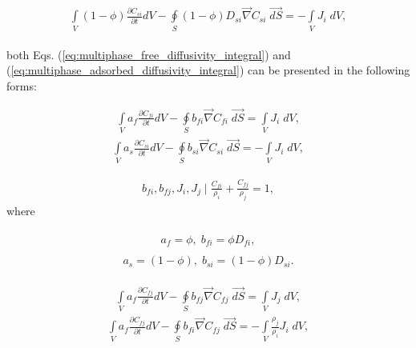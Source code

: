 \documentclass[a4paper,14pt,english]{extreport}
\begin{document}
\begin{eqnarray}
\begin{gathered}
\label{eq:multiphase_adsorbed_diffusivity_integral}
\int \limits_{V} \left(\mathit{1}-\phi\right) \frac{\partial C_{si}}{\partial t} dV - \oint \limits_{S} \left(\mathit{1}-\phi\right) D_{si} \vec{\nabla}C_{si} \; \vec{dS} = -\int \limits_{V}J_i \; dV,
\end{gathered}
\end{eqnarray}

both Eqs. (\ref{eq:multiphase_free_diffusivity_integral}) and (\ref{eq:multiphase_adsorbed_diffusivity_integral}) can be presented in the following forms:

\begin{eqnarray}
\label{eq:multiphase_diffusivity_simplified_integral}
\int \limits_{V} a_{f} \frac{\partial C_{fi}}{\partial t} dV - \oint \limits_{S} b_{fi} \vec{\nabla}C_{fi} \; \vec{dS} = \int \limits_{V} J_{i} \; dV,
\end{eqnarray}
\begin{eqnarray}
\label{eq:multiphase_diffusivity_simplified_integral}
\int \limits_{V} a_{s} \frac{\partial C_{si}}{\partial t} dV - \oint \limits_{S} b_{si} \vec{\nabla}C_{si} \; \vec{dS} = -\int \limits_{V} J_{i} \; dV,
\end{eqnarray}

\begin{eqnarray}
\label{eq:multiphase_diffusivity_densities}
b_{fi}, b_{fj}, J_{i}, J_{j} \mid \frac{C_{fi}}{\rho_i} + \frac{C_{fj}}{\rho_j} = \mathit{1},
\end{eqnarray}
where 

\begin{eqnarray}
\label{eq:multiphase_diffusivity_a_b_coeffs_free}
\begin{gathered}
a_{f} = \phi, \; b_{fi} = \phi D_{fi},
\end{gathered}
\end{eqnarray}
\begin{eqnarray}
\label{eq:multiphase_diffusivity_a_b_coeffs_adsorbed}
\begin{gathered}
a_{s} = \left(\mathit{1}-\phi\right), \; b_{si} = \left(\mathit{1}-\phi\right) D_{si}.
\end{gathered}
\end{eqnarray}

\begin{eqnarray}
\label{eq:multiphase_diffusivity_simplified_integral}
\int \limits_{V} a_{f} \frac{\partial C_{fj}}{\partial t} dV - \oint \limits_{S} b_{fj} \vec{\nabla}C_{fj} \; \vec{dS} = \int \limits_{V} J_{j} \; dV,
\end{eqnarray}
\begin{eqnarray}
\label{eq:multiphase_diffusivity_simplified_integral}
\int \limits_{V} a_{f} \frac{\partial C_{fj}}{\partial t} dV - \oint \limits_{S} b_{fi} \vec{\nabla}C_{fj} \; \vec{dS} = -\int \limits_{V} \frac{\rho_j}{\rho_i}J_{i} \; dV,
\end{eqnarray}
\end{document}
